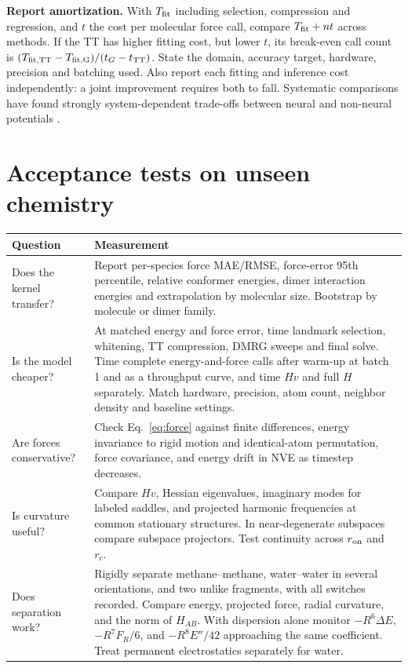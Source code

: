 \documentclass[11pt,a4paper]{article}
\begin{document}
\textbf{Report amortization.} With $T_{\rm fit}$ including selection, compression and regression, and $t$ the cost per molecular force call, compare $T_{\rm fit}+nt$ across methods. If the TT has higher fitting cost, but lower $t$, its break-even call count is $(T_{\rm fit,TT}-T_{\rm fit,G})/(t_G-t_{\rm TT})$. State the domain, accuracy target, hardware, precision and batching used. Also report each fitting and inference cost independently: a joint improvement requires both to fall. Systematic comparisons have found strongly system-dependent trade-offs between neural and non-neural potentials \cite{benchmark}.
\pg\section{Acceptance tests on unseen chemistry}
\begin{center}\small
\begin{tabularx}{\linewidth}{@{}p{32mm}X@{}}\toprule
Question & Measurement\\\midrule
Does the kernel transfer? & Report per-species force MAE/RMSE, force-error 95th percentile, relative conformer energies, dimer interaction energies and extrapolation by molecular size. Bootstrap by molecule or dimer family.\\
Is the model cheaper? & At matched energy and force error, time landmark selection, whitening, TT compression, DMRG sweeps and final solve. Time complete energy-and-force calls after warm-up at batch 1 and as a throughput curve, and time $Hv$ and full $H$ separately. Match hardware, precision, atom count, neighbor density and baseline settings.\\
Are forces conservative? & Check Eq.~\eqref{eq:force} against finite differences, energy invariance to rigid motion and identical-atom permutation, force covariance, and energy drift in NVE as timestep decreases.\\
Is curvature useful? & Compare $Hv$, Hessian eigenvalues, imaginary modes for labeled saddles, and projected harmonic frequencies at common stationary structures. In near-degenerate subspaces compare subspace projectors. Test continuity across $r_{\rm on}$ and $r_c$.\\
Does separation work? & Rigidly separate methane--methane, water--water in several orientations, and two unlike fragments, with all switches recorded. Compare energy, projected force, radial curvature, and the norm of $H_{AB}$. With dispersion alone monitor $-R^6\Delta E$, $-R^7F_R/6$, and $-R^8E''/42$ approaching the same coefficient. Treat permanent electrostatics separately for water.\\\bottomrule
\end{tabularx}
\end{center}
\end{document}

